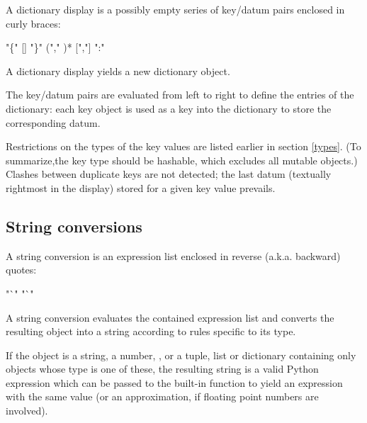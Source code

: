 A dictionary display is a possibly empty series of key/datum pairs
enclosed in curly braces:

\begin{productionlist}
             {"\{" [] "\}"}
             { ("," )* [","]}
             { ":" }
\end{productionlist}

A dictionary display yields a new dictionary object.

The key/datum pairs are evaluated from left to right to define the
entries of the dictionary: each key object is used as a key into the
dictionary to store the corresponding datum.

Restrictions on the types of the key values are listed earlier in
section \ref{types}.  (To summarize,the key type should be hashable,
which excludes all mutable objects.)  Clashes between duplicate keys
are not detected; the last datum (textually rightmost in the display)
stored for a given key value prevails.


\subsection{String conversions\label{string-conversions}}

A string conversion is an expression list enclosed in reverse (a.k.a.
backward) quotes:

\begin{productionlist}
             {"`"  "`"}
\end{productionlist}

A string conversion evaluates the contained expression list and
converts the resulting object into a string according to rules
specific to its type.

If the object is a string, a number, , or a tuple, list or
dictionary containing only objects whose type is one of these, the
resulting string is a valid Python expression which can be passed to
the built-in function  to yield an expression with the
same value (or an approximation, if floating point numbers are
involved).

